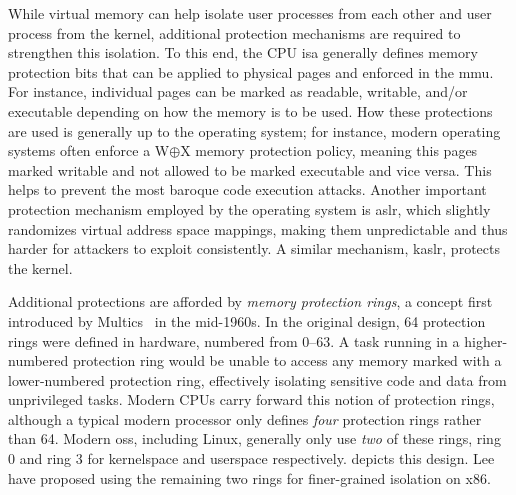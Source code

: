 While virtual memory can help isolate user processes from each other and user process from
the kernel, additional protection mechanisms are required to strengthen this isolation. To
this end, the CPU \gls{isa} generally defines memory protection bits that can be applied
to physical pages and enforced in the \gls{mmu}. For instance, individual pages can be
marked as readable, writable, and/or executable depending on how the memory is to be used.
How these protections are used is generally up to the operating system; for instance,
modern operating systems often enforce a W$\oplus$X memory protection policy, meaning this
pages marked writable and not allowed to be marked executable and vice versa. This helps
to prevent the most baroque code execution attacks. Another important protection mechanism
employed by the operating system is \gls{aslr}, which slightly randomizes virtual address
space mappings, making them unpredictable and thus harder for attackers to exploit
consistently. A similar mechanism, \gls{kaslr}, protects the kernel. 

Additional protections are afforded by \textit{memory protection rings}, a concept first
introduced by Multics~\cite{vyssotsky1965_multics, corbato1965_multics} in the mid-1960s.
In the original design, 64 protection rings were defined in hardware, numbered from 0--63.
A task running in a higher-numbered protection ring would be unable to access any memory
marked with a lower-numbered protection ring, effectively isolating sensitive code and
data from unprivileged tasks. Modern CPUs carry forward this notion of protection rings,
although a typical modern processor only defines \textit{four} protection rings rather
than 64. Modern \gls{os}s, including Linux, generally only use \textit{two} of these
rings, ring 0 and ring 3 for kernelspace and userspace respectively. 
depicts this design. Lee \etal~\cite{lee2018_lotr} have proposed using the remaining two
rings for finer-grained isolation on x86.

